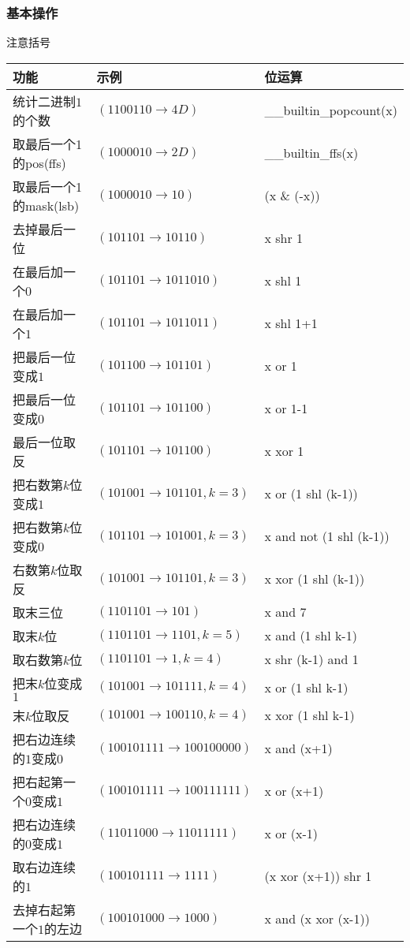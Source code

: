 	\subsubsection{基本操作}
	注意括号\\
		\begin{table}[htbp]
		\centering
		\begin{tabular}{l|l|l}
		\toprule
		功能 & 示例 & 位运算\\
		\midrule
		统计二进制$1$的个数  & $(1100110\rightarrow 4D)$        &\_\_builtin\_popcount(x)\\
		取最后一个1的pos(ffs) & $(1000010\rightarrow 2D)$       &\_\_builtin\_ffs(x)\\
		取最后一个1的mask(lsb)   & $(1000010\rightarrow 10)$      & (x \& (-x))\\
		去掉最后一位		  & $(101101\rightarrow 10110)$		   & x shr 1\\
		在最后加一个$0$		 & $(101101\rightarrow1011010)$		 & x shl 1\\
		在最后加一个$1$		 & $(101101\rightarrow1011011)$		 & x shl 1+1\\
		把最后一位变成$1$	   & $(101100\rightarrow101101)$		  & x or 1\\
		把最后一位变成$0$	   & $(101101\rightarrow101100)$		  & x or 1-1\\
		最后一位取反		  & $(101101\rightarrow101100)$		  & x xor 1\\
		把右数第$k$位变成$1$	  & $(101001\rightarrow101101,k=3)$	  & x or (1 shl (k-1))\\
		把右数第$k$位变成$0$	  & $(101101\rightarrow101001,k=3)$	  & x and not (1 shl (k-1))\\
		右数第$k$位取反		 & $(101001\rightarrow101101,k=3)$	  & x xor (1 shl (k-1))\\
		取末三位			  & $(1101101\rightarrow101)$			& x and 7\\
		取末$k$位			   & $(1101101\rightarrow1101,k=5)$	   & x and (1 shl k-1)\\
		取右数第$k$位		   & $(1101101\rightarrow1,k=4)$		  & x shr (k-1) and 1\\
		把末$k$位变成$1$		  & $(101001\rightarrow101111,k=4)$	  & x or (1 shl k-1)\\
		末$k$位取反			 & $(101001\rightarrow100110,k=4)$	  & x xor (1 shl k-1)\\
		把右边连续的$1$变成$0$	& $(100101111\rightarrow100100000)$	& x and (x+1)\\
		把右起第一个$0$变成$1$	& $(100101111\rightarrow100111111)$	& x or (x+1)\\
		把右边连续的$0$变成$1$	& $(11011000\rightarrow11011111)$	  & x or (x-1)\\
		取右边连续的$1$		 & $(100101111\rightarrow1111)$		 & (x xor (x+1)) shr 1\\
		去掉右起第一个$1$的左边 & $(100101000\rightarrow1000)$		 & x and (x xor (x-1))\\
		\bottomrule
		\end{tabular}
	\end{table}
	
